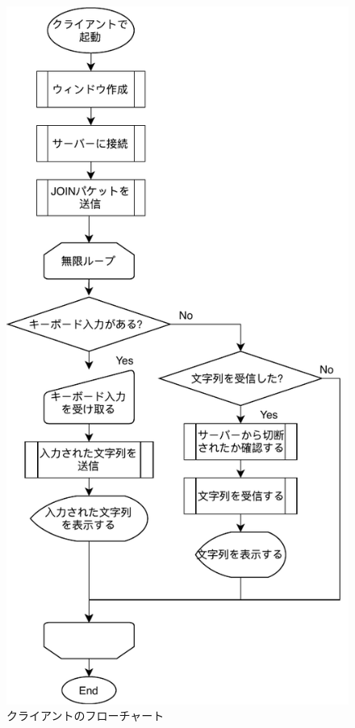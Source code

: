 \documentclass[uplatex,dvipdfmx,11pt,a4paper]{jsarticle} %
\begin{document}
\begin{figure}[H]
\centering
\includegraphics[]{figures/flow/3.pdf}
\caption{クライアントのフローチャート}
\label{fg:client}
\end{figure}
\end{document}
